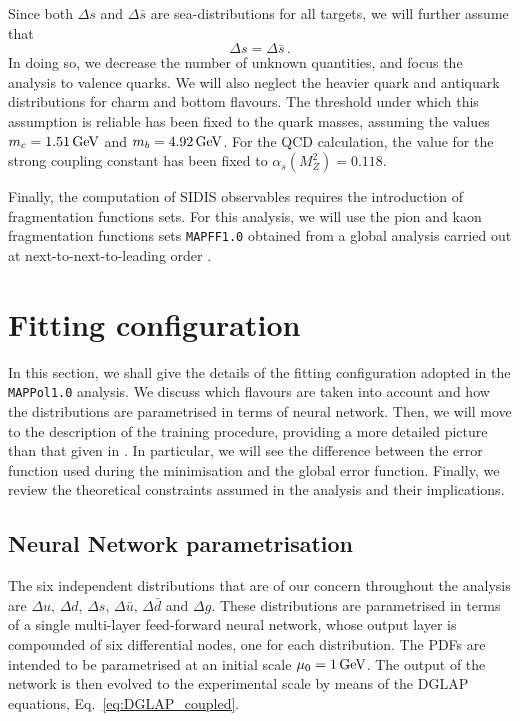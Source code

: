 Since both $\Delta s$ and $\Delta \bar{s}$ are sea-distributions for all targets, we will further assume that
\begin{equation}
  \Delta s = \Delta \bar{s} \,.
\end{equation}
In doing so, we decrease the number of unknown quantities, and focus the analysis to valence quarks. We will also neglect the heavier quark and antiquark distributions for charm and bottom flavours. The threshold under which this assumption is reliable has been fixed to the quark masses, assuming the values $m_c=1.51\, \textrm{GeV}$ and $m_b=4.92\, \textrm{GeV}$. For the QCD calculation, the value for the strong coupling constant has been fixed to $\alpha_s(M_Z^2) = 0.118$.\par
Finally, the computation of SIDIS observables requires the introduction of fragmentation functions sets. For this analysis, we will use the pion and kaon fragmentation functions sets \texttt{MAPFF1.0} obtained from a global analysis carried out at next-to-next-to-leading order \cite{Khalek:2021gxf, AbdulKhalek:2022laj}.

\section{Fitting configuration}
\label{sec:4.3}
In this section, we shall give the details of the fitting configuration adopted in the \texttt{MAPPol1.0} analysis. We discuss which flavours are taken into account and how the distributions are parametrised in terms of neural network. Then, we will move to the description of the training procedure, providing a more detailed picture than that given in . In particular, we will see the difference between the error function used during the minimisation and the global error function. Finally, we review the theoretical constraints assumed in the analysis and their implications.

\subsection*{Neural Network parametrisation}
The six independent distributions that are of our concern throughout the analysis are $\Delta u, \, \Delta d, \, \Delta s, \, \Delta \bar{u}, \, \Delta \bar{d}$ and $\Delta g$. These distributions are parametrised in terms of a single multi-layer feed-forward neural network, whose output layer is compounded of six differential nodes, one for each distribution. The PDFs are intended to be parametrised at an initial scale $\mu_0 = 1 \, \textrm{GeV}$. The output of the network is then evolved to the experimental scale by means of the DGLAP equations, Eq.~\eqref{eq:DGLAP_coupled}.%

